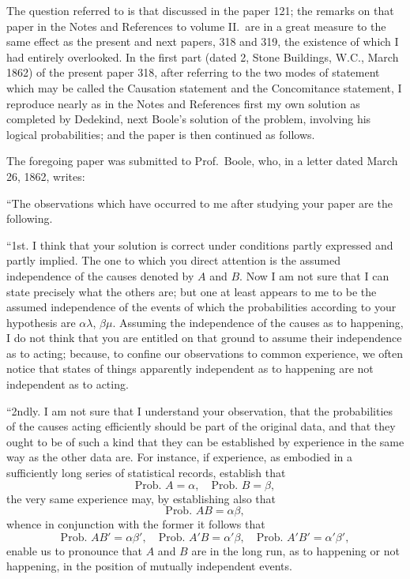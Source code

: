 \documentclass[11pt,a4paper]{article}
\theoremstyle{plain}
\begin{document}
\medskip

The question referred to is that discussed in the paper 121; the remarks on that paper in the Notes and References to volume II.\ are in a great measure to the same effect as the present and next papers, 318 and 319, the existence of which I had entirely overlooked. In the first part (dated 2, Stone Buildings, W.C., March 1862) of the present paper 318, after referring to the two modes of statement which may be called the Causation statement and the Concomitance statement, I reproduce nearly as in the Notes and References first my own solution as completed by Dedekind, next Boole's solution of the problem, involving his logical probabilities; and the paper is then continued as follows.

The foregoing paper was submitted to Prof.\ Boole, who, in a letter dated March 26, 1862, writes:

``The observations which have occurred to me after studying your paper are the following.

``1st. I think that your solution is correct under conditions partly expressed and partly implied. The one to which you direct attention is the assumed independence of the causes denoted by $A$ and $B$. Now I am not sure that I can state precisely what the others are; but one at least appears to me to be the assumed independence of the events of which the probabilities according to your hypothesis are $\alpha\lambda$, $\beta\mu$. Assuming the independence of the causes as to happening, I do not think that you are entitled on that ground to assume their independence as to acting; because, to confine our observations to common experience, we often notice that states of things apparently independent as to happening are not independent as to acting.

``2ndly. I am not sure that I understand your observation, that the probabilities of the causes acting efficiently should be part of the original data, and that they ought to be of such a kind that they can be established by experience in the same way as the other data are. For instance, if experience, as embodied in a sufficiently long series of statistical records, establish that
\[
\text{Prob.\ } A = \alpha, \quad \text{Prob.\ } B = \beta,
\]
the very same experience may, by establishing also that
\[
\text{Prob.\ } AB = \alpha\beta,
\]
whence in conjunction with the former it follows that
\[
\text{Prob.\ } AB' = \alpha\beta', \quad \text{Prob.\ } A'B = \alpha'\beta, \quad \text{Prob.\ } A'B' = \alpha'\beta',
\]
enable us to pronounce that $A$ and $B$ are in the long run, as to happening or not happening, in the position of mutually independent events.
\end{document}
